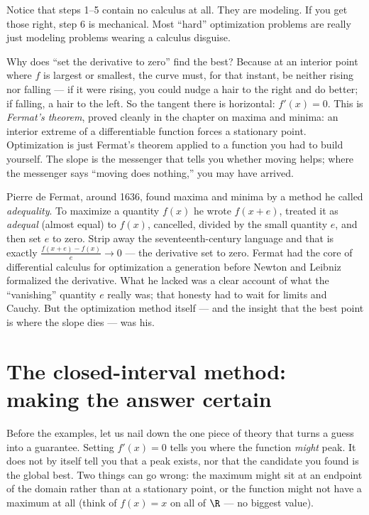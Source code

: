 Notice that steps 1--5 contain no calculus at all. They are modeling. If you get
those right, step 6 is mechanical. Most ``hard'' optimization problems are really
just modeling problems wearing a calculus disguise.

\begin{whybox}
Why does ``set the derivative to zero'' find the best? Because at an interior point
where $f$ is largest or smallest, the curve must, for that instant, be neither rising
nor falling --- if it were rising, you could nudge a hair to the right and do better;
if falling, a hair to the left. So the tangent there is horizontal: $f'(x)=0$. This
is \emph{Fermat's theorem}, proved cleanly in the chapter on maxima and minima: an
interior extreme of a differentiable function forces a stationary point. Optimization
is just Fermat's theorem applied to a function you had to build yourself. The slope
is the messenger that tells you whether moving helps; where the messenger says
``moving does nothing,'' you may have arrived.
\end{whybox}

\begin{historybox}
Pierre de Fermat, around 1636, found maxima and minima by a method he called
\emph{adequality}. To maximize a quantity $f(x)$ he wrote $f(x+e)$, treated it as
\emph{adequal} (almost equal) to $f(x)$, cancelled, divided by the small quantity
$e$, and then set $e$ to zero. Strip away the seventeenth-century language and that
is exactly $\frac{f(x+e)-f(x)}{e}\to 0$ --- the derivative set to zero. Fermat had
the core of differential calculus for optimization a generation before Newton and
Leibniz formalized the derivative. What he lacked was a clear account of what the
``vanishing'' quantity $e$ really was; that honesty had to wait for limits and
Cauchy. But the optimization method itself --- and the insight that the best point is
where the slope dies --- was his.
\end{historybox}

\section{The closed-interval method: making the answer certain}

Before the examples, let us nail down the one piece of theory that turns a guess into
a guarantee. Setting $f'(x)=0$ tells you where the function \emph{might} peak. It does
not by itself tell you that a peak exists, nor that the candidate you found is the
global best. Two things can go wrong: the maximum might sit at an endpoint of the
domain rather than at a stationary point, or the function might not have a maximum at
all (think of $f(x)=x$ on all of $\R$ --- no biggest value).

